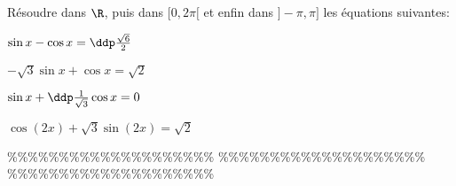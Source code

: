 



\begin{exercice}  \;
R\'esoudre dans $\R$, puis dans $\lbrack 0,2\pi\lbrack$ et enfin dans $\rbrack -\pi,\pi\rbrack$ les \'equations suivantes:\\
\begin{enumerate}
\noindent \begin{minipage}[t]{0.45\textwidth}
\item $\sin{x}-\cos{x}=\ddp\frac{\sqrt{6}}{2}$
\item $-\sqrt{3}\sin{x}+\cos{x}=\sqrt{2}$
\end{minipage}
\begin{minipage}[t]{0.45\textwidth}
\item $\sin{x}+\ddp\frac{1}{\sqrt{3}}\cos{x}=0$
\item $\cos{(2x)}+\sqrt{3}\sin{(2x)}=\sqrt{2}$
\end{minipage}
\end{enumerate}
\end{exercice}


\%\%\%\%\%\%\%\%\%\%\%\%\%\%\%\%\%\%\%\%
\%\%\%\%\%\%\%\%\%\%\%\%\%\%\%\%\%\%\%\%
\%\%\%\%\%\%\%\%\%\%\%\%\%\%\%\%\%\%\%\%




